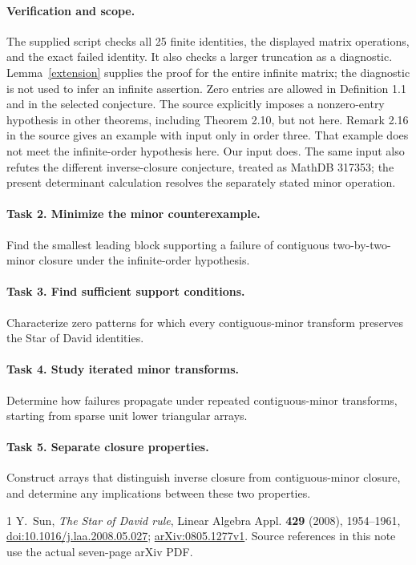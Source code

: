 \documentclass[10pt]{article}
\begin{document}
\paragraph{Verification and scope.}
The supplied script checks all 25 finite identities, the displayed
matrix operations, and the exact failed identity. It also checks a
larger truncation as a diagnostic. Lemma~\ref{extension} supplies the
proof for the entire infinite matrix; the diagnostic is not used to
infer an infinite assertion. Zero entries are allowed in Definition 1.1
and in the selected conjecture. The source explicitly imposes a
nonzero-entry hypothesis in other theorems, including Theorem 2.10,
but not here.
Remark 2.16 in the source gives an example with input only in order three. That example does not meet the infinite-order hypothesis here. Our input does. The same input also refutes the different inverse-closure conjecture, treated as MathDB 317353; the present determinant calculation resolves the separately stated minor operation.

\paragraph{Task 2. Minimize the minor counterexample.}
Find the smallest leading block supporting a failure of contiguous
two-by-two-minor closure under the infinite-order hypothesis.

\paragraph{Task 3. Find sufficient support conditions.}
Characterize zero patterns for which every contiguous-minor transform
preserves the Star of David identities.

\paragraph{Task 4. Study iterated minor transforms.}
Determine how failures propagate under repeated contiguous-minor
transforms, starting from sparse unit lower triangular arrays.

\paragraph{Task 5. Separate closure properties.}
Construct arrays that distinguish inverse closure from contiguous-minor
closure, and determine any implications between these two properties.

\begin{thebibliography}{1}
 Y.~Sun, \emph{The Star of David rule}, Linear Algebra
Appl. \textbf{429} (2008), 1954--1961,
\href{https://doi.org/10.1016/j.laa.2008.05.027}{doi:10.1016/j.laa.2008.05.027};
\href{https://arxiv.org/abs/0805.1277}{arXiv:0805.1277v1}.
Source references in this note use the actual seven-page arXiv PDF.
\end{thebibliography}
\end{document}

